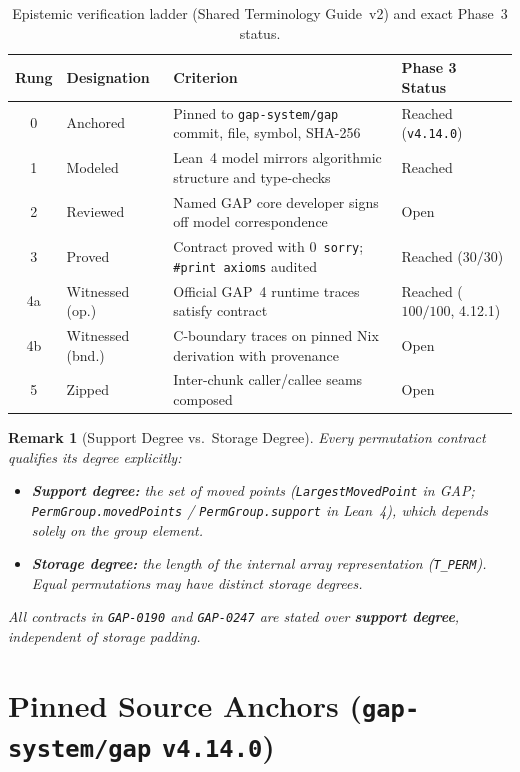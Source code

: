 \documentclass[11pt,a4paper]{article}
\newtheorem{remark}[theorem]{Remark}
\begin{document}
\begin{table}[h!]
\centering
\small
\begin{tabularx}{\textwidth}{@{}c l X l@{}}
\toprule
\textbf{Rung} & \textbf{Designation} & \textbf{Criterion} & \textbf{Phase 3 Status} \\
\midrule
0 & Anchored & Pinned to \texttt{gap-system/gap} commit, file, symbol, SHA-256 & Reached (\texttt{v4.14.0}) \\
1 & Modeled & Lean~4 model mirrors algorithmic structure and type-checks & Reached \\
2 & Reviewed & Named GAP core developer signs off model correspondence & Open \\
3 & Proved & Contract proved with $0$~\texttt{sorry}; \texttt{\#print axioms} audited & Reached ($30/30$) \\
4a & Witnessed (op.) & Official GAP~4 runtime traces satisfy contract & Reached ($100/100$, 4.12.1) \\
4b & Witnessed (bnd.) & C-boundary traces on pinned Nix derivation with provenance & Open \\
5 & Zipped & Inter-chunk caller/callee seams composed & Open \\
\bottomrule
\end{tabularx}
\caption{Epistemic verification ladder (Shared Terminology Guide~v2) and exact Phase~3 status.}
\label{tab:rungs}
\end{table}

\begin{remark}[Support Degree vs.\ Storage Degree]
Every permutation contract qualifies its degree explicitly:
\begin{itemize}
  \item \textbf{Support degree:} the set of moved points (\texttt{LargestMovedPoint} in GAP; \texttt{PermGroup.\allowbreak movedPoints} / \texttt{PermGroup.\allowbreak support} in Lean~4), which depends solely on the group element.
  \item \textbf{Storage degree:} the length of the internal array representation (\texttt{T\_PERM}). Equal permutations may have distinct storage degrees.
\end{itemize}
All contracts in \texttt{GAP-0190} and \texttt{GAP-0247} are stated over \textbf{support degree}, independent of storage padding.
\end{remark}

\section{Pinned Source Anchors (\texttt{gap-system/gap} \texttt{v4.14.0})}
\end{document}
